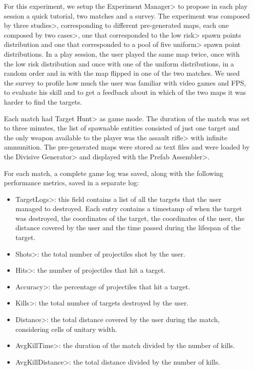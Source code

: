 For this experiment, we setup the \<Experiment Manager> to propose in each play session a quick tutorial, two matches and a survey. The experiment was composed by three \<studies>, corresponding to different pre-generated maps, each one composed by two \<cases>, one that corresponded to the \<low risk> spawn points distribution and one that corresponded to a pool of five \<uniform> spawn point distributions. In a play session, the user played the same map twice, once with the low risk distribution and once with one of the uniform distributions, in a random order and in with the map flipped in one of the two matches. We used the survey to profile how much the user was familiar with video games and FPS, to evaluate his skill and to get a feedback about in which of the two maps it was harder to find the targets.

\par

Each match had \<Target Hunt> as game mode. The duration of the match was set to three minutes, the list of spawnable entities consisted of just one target and the only weapon available to the player was the \<assault rifle> with infinite ammunition. The pre-generated maps were stored as text files and were loaded by the \<Divisive Generator> and displayed with the \<Prefab Assembler>. 

\par
 
For each match, a complete game log was saved, along with the following performance metrics, saved in a separate log:
 
 \begin{itemize}
\item \<TargetLogs>: this field contains a list of all the targets that the user managed to destroyed. Each entry contains a timestamp of when the target was destroyed, the coordinates of the target, the coordinates of the user, the distance covered by the user and the time passed during the lifespan of the target.
\item \<Shots>: the total number of projectiles shot by the user.
\item \<Hits>: the number of projectiles that hit a target.
\item \<Accuracy>: the percentage of projectiles that hit a target.
\item \<Kills>: the total number of targets destroyed by the user.
\item \<Distance>: the total distance covered by the user during the match, considering cells of unitary width.
\item \<AvgKillTime>: the duration of the match divided by the number of kills.
\item \<AvgKillDistance>: the total distance divided by the number of kills.
\end{itemize}

